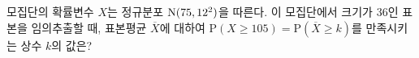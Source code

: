모집단의 확률변수 $X$는 정규분포 $\mathrm{N}(75{,}\mkern3mu\mathopen{}12^2)$을 따른다. 이 모집단에서 크기가 36인 표본을 임의추출할 때, 표본평균 $\overline{X}$에 대하여 $\mathrm{P}(X\ge 105)=\mathrm{P}(\overline{X}\ge k)$를 만족시키는 상수 $k$의 값은?
